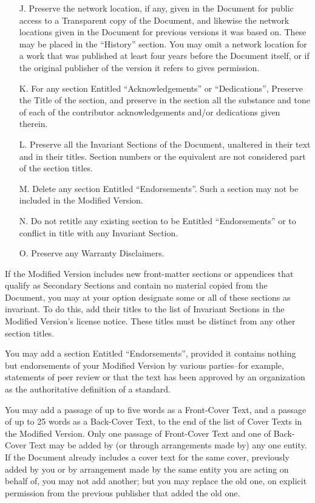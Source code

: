 \documentclass[10pt,a4paper,final]{book}
\begin{document}
{\begin{itemize}
\item[J.]
   Preserve the network location, if any, given in the Document for
   public access to a Transparent copy of the Document, and likewise
   the network locations given in the Document for previous versions
   it was based on.  These may be placed in the ``History'' section.
   You may omit a network location for a work that was published at
   least four years before the Document itself, or if the original
   publisher of the version it refers to gives permission.
   
\item[K.]
   For any section Entitled ``Acknowledgements'' or ``Dedications'',
   Preserve the Title of the section, and preserve in the section all
   the substance and tone of each of the contributor acknowledgements
   and/or dedications given therein.
   
\item[L.]
   Preserve all the Invariant Sections of the Document,
   unaltered in their text and in their titles.  Section numbers
   or the equivalent are not considered part of the section titles.
   
\item[M.]
   Delete any section Entitled ``Endorsements''.  Such a section
   may not be included in the Modified Version.
   
\item[N.]
   Do not retitle any existing section to be Entitled ``Endorsements''
   or to conflict in title with any Invariant Section.
   
\item[O.]
   Preserve any Warranty Disclaimers.
\end{itemize}

If the Modified Version includes new front-matter sections or
appendices that qualify as Secondary Sections and contain no material
copied from the Document, you may at your option designate some or all
of these sections as invariant.  To do this, add their titles to the
list of Invariant Sections in the Modified Version's license notice.
These titles must be distinct from any other section titles.

You may add a section Entitled ``Endorsements'', provided it contains
nothing but endorsements of your Modified Version by various
parties--for example, statements of peer review or that the text has
been approved by an organization as the authoritative definition of a
standard.

You may add a passage of up to five words as a Front-Cover Text, and a
passage of up to 25 words as a Back-Cover Text, to the end of the list
of Cover Texts in the Modified Version.  Only one passage of
Front-Cover Text and one of Back-Cover Text may be added by (or
through arrangements made by) any one entity.  If the Document already
includes a cover text for the same cover, previously added by you or
by arrangement made by the same entity you are acting on behalf of,
you may not add another; but you may replace the old one, on explicit
permission from the previous publisher that added the old one.

}
\end{document}
